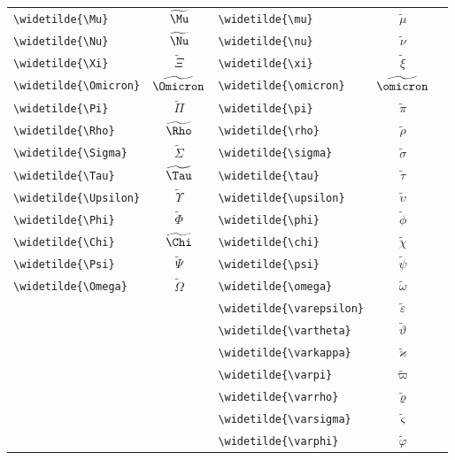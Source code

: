 \documentclass[12pt,a4paper]{article}
\begin{document}
\begin{longtable}{|l|c|l|c|c|}
\verb|\widetilde{\Mu}|         & $\widetilde{\Mu}$      & \verb|\widetilde{\mu}|         & $\widetilde{\mu}$         & \\
\verb|\widetilde{\Nu}|         & $\widetilde{\Nu}$      & \verb|\widetilde{\nu}|         & $\widetilde{\nu}$         & \\
\verb|\widetilde{\Xi}|         & $\widetilde{\Xi}$      & \verb|\widetilde{\xi}|         & $\widetilde{\xi}$         & \\
\verb|\widetilde{\Omicron}|    & $\widetilde{\Omicron}$ & \verb|\widetilde{\omicron}|    & $\widetilde{\omicron}$    & \\
\verb|\widetilde{\Pi}|         & $\widetilde{\Pi}$      & \verb|\widetilde{\pi}|         & $\widetilde{\pi}$         & \\
\verb|\widetilde{\Rho}|        & $\widetilde{\Rho}$     & \verb|\widetilde{\rho}|        & $\widetilde{\rho}$        & \\
\verb|\widetilde{\Sigma}|      & $\widetilde{\Sigma}$   & \verb|\widetilde{\sigma}|      & $\widetilde{\sigma}$      & \\
\verb|\widetilde{\Tau}|        & $\widetilde{\Tau}$     & \verb|\widetilde{\tau}|        & $\widetilde{\tau}$        & \\
\verb|\widetilde{\Upsilon}|    & $\widetilde{\Upsilon}$ & \verb|\widetilde{\upsilon}|    & $\widetilde{\upsilon}$    & \\
\verb|\widetilde{\Phi}|        & $\widetilde{\Phi}$     & \verb|\widetilde{\phi}|        & $\widetilde{\phi}$        & \\
\verb|\widetilde{\Chi}|        & $\widetilde{\Chi}$     & \verb|\widetilde{\chi}|        & $\widetilde{\chi}$        & \\
\verb|\widetilde{\Psi}|        & $\widetilde{\Psi}$     & \verb|\widetilde{\psi}|        & $\widetilde{\psi}$        & \\
\verb|\widetilde{\Omega}|      & $\widetilde{\Omega}$   & \verb|\widetilde{\omega}|      & $\widetilde{\omega}$      & \\
                               &                        & \verb|\widetilde{\varepsilon}| & $\widetilde{\varepsilon}$ & \\
                               &                        & \verb|\widetilde{\vartheta}|   & $\widetilde{\vartheta}$   & \\
                               &                        & \verb|\widetilde{\varkappa}|   & $\widetilde{\varkappa}$   & \\
                               &                        & \verb|\widetilde{\varpi}|      & $\widetilde{\varpi}$      & \\
                               &                        & \verb|\widetilde{\varrho}|     & $\widetilde{\varrho}$     & \\
                               &                        & \verb|\widetilde{\varsigma}|   & $\widetilde{\varsigma}$   & \\
                               &                        & \verb|\widetilde{\varphi}|     & $\widetilde{\varphi}$     & \\
\hline
\end{longtable}
\end{document}

